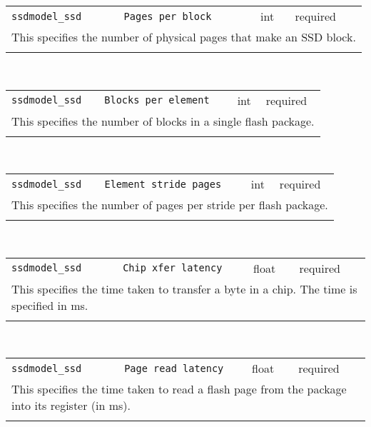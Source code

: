 \noindent 
\begin{tabular}{|p{\lpmodwidth}|p{\lpnamewidth}|p{0.5in}|p{0.5in}|}
\cline{1-4}
\texttt{ssdmodel\_ssd} & \texttt{Pages per block} & int & required \\ 
\cline{1-4}
\multicolumn{4}{|p{6in}|}{
This specifies the number of physical pages that make an SSD block.
}\\ 
\cline{1-4}
\multicolumn{4}{p{5in}}{}\\
\end{tabular}\\ 
\noindent 
\begin{tabular}{|p{\lpmodwidth}|p{\lpnamewidth}|p{0.5in}|p{0.5in}|}
\cline{1-4}
\texttt{ssdmodel\_ssd} & \texttt{Blocks per element} & int & required \\ 
\cline{1-4}
\multicolumn{4}{|p{6in}|}{
This specifies the number of blocks in a single flash package.
}\\ 
\cline{1-4}
\multicolumn{4}{p{5in}}{}\\
\end{tabular}\\ 
\noindent 
\begin{tabular}{|p{\lpmodwidth}|p{\lpnamewidth}|p{0.5in}|p{0.5in}|}
\cline{1-4}
\texttt{ssdmodel\_ssd} & \texttt{Element stride pages} & int & required \\ 
\cline{1-4}
\multicolumn{4}{|p{6in}|}{
This specifies the number of pages per stride per flash package.
}\\ 
\cline{1-4}
\multicolumn{4}{p{5in}}{}\\
\end{tabular}\\ 
\noindent 
\begin{tabular}{|p{\lpmodwidth}|p{\lpnamewidth}|p{0.5in}|p{0.5in}|}
\cline{1-4}
\texttt{ssdmodel\_ssd} & \texttt{Chip xfer latency} & float & required \\ 
\cline{1-4}
\multicolumn{4}{|p{6in}|}{
This specifies the time taken to transfer a byte in a chip. The time
is specified in ms.
}\\ 
\cline{1-4}
\multicolumn{4}{p{5in}}{}\\
\end{tabular}\\ 
\noindent 
\begin{tabular}{|p{\lpmodwidth}|p{\lpnamewidth}|p{0.5in}|p{0.5in}|}
\cline{1-4}
\texttt{ssdmodel\_ssd} & \texttt{Page read latency} & float & required \\ 
\cline{1-4}
\multicolumn{4}{|p{6in}|}{
This specifies the time taken to read a flash page from the package
into its register (in ms).
}\\ 
\cline{1-4}
\multicolumn{4}{p{5in}}{}\\
\end{tabular}\\ 

